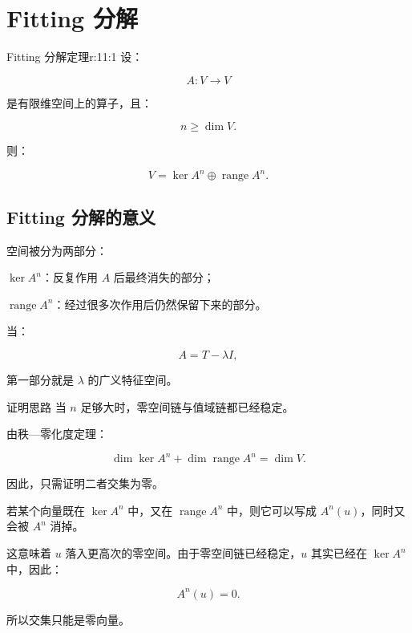 
\chapter{Fitting 分解}


\begin{jthm}{Fitting 分解定理}{r:11:1}
设：

\[
A:V\to V
\]

是有限维空间上的算子，且：

\[
n\ge\dim V.
\]

则：

\[
V
=
\ker A^n
\oplus
\operatorname{range}A^n.
\]
\end{jthm}

\section{Fitting 分解的意义}

空间被分为两部分：

\begin{jitem}
\item %
$\ker A^n$：反复作用 $A$ 后最终消失的部分；
\item %
$\operatorname{range}A^n$：经过很多次作用后仍然保留下来的部分。
\end{jitem}

当：

\[
A=T-\lambda I,
\]

第一部分就是 $\lambda$ 的广义特征空间。

\begin{jproof}{证明思路}
当 $n$ 足够大时，零空间链与值域链都已经稳定。

由秩—零化度定理：

\[
\dim\ker A^n+\dim\operatorname{range}A^n
=
\dim V.
\]

因此，只需证明二者交集为零。

若某个向量既在 $\ker A^n$ 中，又在 $\operatorname{range}A^n$ 中，则它可以写成 $A^n(u)$，同时又会被 $A^n$ 消掉。

这意味着 $u$ 落入更高次的零空间。由于零空间链已经稳定，$u$ 其实已经在 $\ker A^n$ 中，因此：

\[
A^n(u)=0.
\]

所以交集只能是零向量。
\end{jproof}

